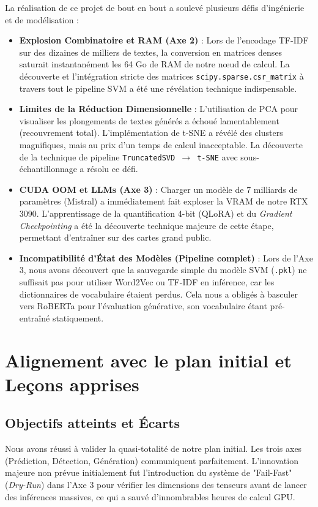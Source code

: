 \documentclass[11pt,a4paper]{article}
\begin{document}
La réalisation de ce projet de bout en bout a soulevé plusieurs défis d'ingénierie et de modélisation :
\begin{itemize}
    \item \textbf{Explosion Combinatoire et RAM (Axe 2)} : Lors de l'encodage TF-IDF sur des dizaines de milliers de textes, la conversion en matrices denses saturait instantanément les 64 Go de RAM de notre nœud de calcul. La découverte et l'intégration stricte des matrices \texttt{scipy.sparse.csr\_matrix} à travers tout le pipeline SVM a été une révélation technique indispensable.
    \item \textbf{Limites de la Réduction Dimensionnelle} : L'utilisation de PCA pour visualiser les plongements de textes générés a échoué lamentablement (recouvrement total). L'implémentation de t-SNE a révélé des clusters magnifiques, mais au prix d'un temps de calcul inacceptable. La découverte de la technique de pipeline \texttt{TruncatedSVD $\rightarrow$ t-SNE} avec sous-échantillonnage a résolu ce défi.
    \item \textbf{CUDA OOM et LLMs (Axe 3)} : Charger un modèle de 7 milliards de paramètres (Mistral) a immédiatement fait exploser la VRAM de notre RTX 3090. L'apprentissage de la quantification 4-bit (QLoRA) et du \textit{Gradient Checkpointing} a été la découverte technique majeure de cette étape, permettant d'entraîner sur des cartes grand public.
    \item \textbf{Incompatibilité d'État des Modèles (Pipeline complet)} : Lors de l'Axe 3, nous avons découvert que la sauvegarde simple du modèle SVM (\texttt{.pkl}) ne suffisait pas pour utiliser Word2Vec ou TF-IDF en inférence, car les dictionnaires de vocabulaire étaient perdus. Cela nous a obligés à basculer vers RoBERTa pour l'évaluation générative, son vocabulaire étant pré-entraîné statiquement.
\end{itemize}

\section{Alignement avec le plan initial et Leçons apprises}

\subsection{Objectifs atteints et Écarts}
Nous avons réussi à valider la quasi-totalité de notre plan initial. Les trois axes (Prédiction, Détection, Génération) communiquent parfaitement. L'innovation majeure non prévue initialement fut l'introduction du système de "Fail-Fast" (\textit{Dry-Run}) dans l'Axe 3 pour vérifier les dimensions des tenseurs avant de lancer des inférences massives, ce qui a sauvé d'innombrables heures de calcul GPU.
\end{document}
